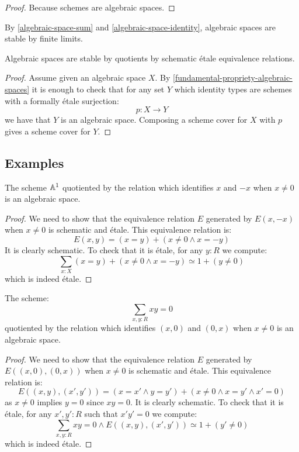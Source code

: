 \begin{proof}
Because schemes are algebraic spaces.
\end{proof}

By \cref{algebraic-space-sum} and \cref{algebraic-space-identity}, algebraic spaces are stable by finite limits.

\begin{lemma}
Algebraic spaces are stable by quotients by schematic étale equivalence relations.
\end{lemma}

\begin{proof}
Assume given an algebraic space $X$. By \cref{fundamental-propriety-algebraic-spaces} it is enough to check that for any set $Y$ which identity types are schemes with a formally étale surjection:
\[p:X\to Y\]
we have that $Y$ is an algebraic space. Composing a scheme cover for $X$ with $p$ gives a scheme cover for $Y$.
\end{proof}

\subsection{Examples}

\begin{example}
The scheme $\mathbb{A}^1$ quotiented by the relation which identifies $x$ and $-x$ when $x\not=0$ is an algebraic space.
\end{example}

\begin{proof}
We need to show that the equivalence relation $E$ generated by $E(x,-x)$ when $x\not=0$ is schematic and étale. This equivalence relation is:
\[E(x,y) = (x=y) + (x\not=0 \land x=-y)\]
It is clearly schematic. To check that it is étale, for any $y:R$ we compute:
\[\sum_{x:X}(x=y) + (x\not=0 \land x=-y) \simeq 1 + (y\not=0)\]
which is indeed étale.
\end{proof}

\begin{example}
The scheme:
\[\sum_{x,y:R} xy=0\]
quotiented by the relation which identifies $(x,0)$ and $(0,x)$ when $x\not=0$ is an algebraic space.
\end{example}

\begin{proof}
We need to show that the equivalence relation $E$ generated by $E((x,0),(0,x))$ when $x\not=0$ is schematic and étale. This equivalence relation is:
\[E((x,y),(x',y')) = (x=x'\land y=y') + (x\not=0 \land x=y' \land x'=0)\]
as $x\not=0$ implies $y=0$ since $xy=0$. It is clearly schematic. To check that it is étale, for any $x',y':R$ such that $x'y'=0$ we compute:
\[\sum_{x,y:R} xy=0 \land E((x,y),(x',y')) \simeq 1+ (y'\not=0)\]
which is indeed étale.
\end{proof}

